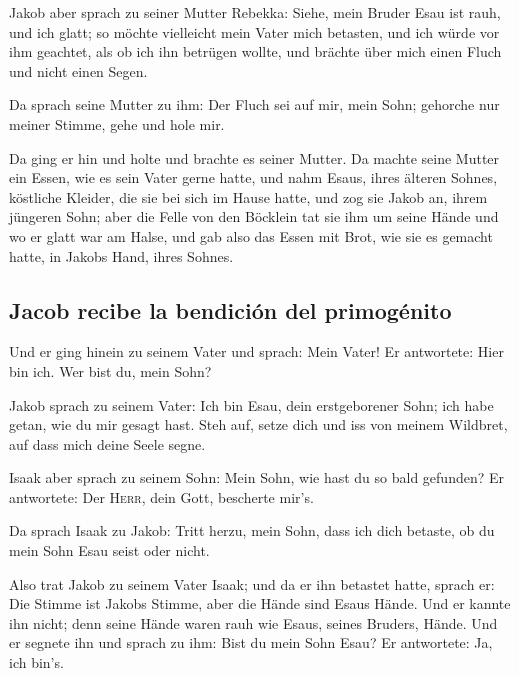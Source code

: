  Jakob aber sprach zu seiner Mutter Rebekka: Siehe, mein
Bruder Esau ist rauh, und ich glatt;  so möchte
vielleicht mein Vater mich betasten, und ich würde vor ihm geachtet, als
ob ich ihn betrügen wollte, und brächte über mich einen Fluch und nicht
einen Segen.

 Da sprach seine Mutter zu ihm: Der Fluch sei auf mir,
mein Sohn; gehorche nur meiner Stimme, gehe und hole mir.

 Da ging er hin und holte und brachte es seiner Mutter.
Da machte seine Mutter ein Essen, wie es sein Vater gerne hatte,
 und nahm Esaus, ihres älteren Sohnes, köstliche Kleider,
die sie bei sich im Hause hatte, und zog sie Jakob an, ihrem jüngeren
Sohn;  aber die Felle von den Böcklein tat sie ihm um
seine Hände und wo er glatt war am Halse,  und gab also
das Essen mit Brot, wie sie es gemacht hatte, in Jakobs Hand, ihres
Sohnes.

\hypertarget{jacob-recibe-la-bendiciuxf3n-del-primoguxe9nito}{%
\subsection{Jacob recibe la bendición del
primogénito}\label{jacob-recibe-la-bendiciuxf3n-del-primoguxe9nito}}

 Und er ging hinein zu seinem Vater und sprach: Mein
Vater! Er antwortete: Hier bin ich. Wer bist du, mein Sohn?

 Jakob sprach zu seinem Vater: Ich bin Esau, dein
erstgeborener Sohn; ich habe getan, wie du mir gesagt hast. Steh auf,
setze dich und iss von meinem Wildbret, auf dass mich deine Seele segne.

 Isaak aber sprach zu seinem Sohn: Mein Sohn, wie hast du
so bald gefunden? Er antwortete: Der \textsc{Herr}, dein Gott, bescherte
mir's.

 Da sprach Isaak zu Jakob: Tritt herzu, mein Sohn, dass
ich dich betaste, ob du mein Sohn Esau seist oder nicht.

 Also trat Jakob zu seinem Vater Isaak; und da er ihn
betastet hatte, sprach er: Die Stimme ist Jakobs Stimme, aber die Hände
sind Esaus Hände.  Und er kannte ihn nicht; denn seine
Hände waren rauh wie Esaus, seines Bruders, Hände. Und er segnete ihn
 und sprach zu ihm: Bist du mein Sohn Esau? Er
antwortete: Ja, ich bin's.

